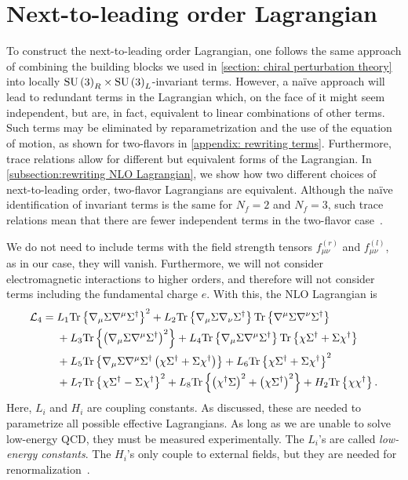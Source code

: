 \section{Next-to-leading order Lagrangian}
\label{section: nlo chpt}


To construct the next-to-leading order Lagrangian, one follows the same approach of combining the building blocks we used in \autoref{section: chiral perturbation theory} into locally $\text{SU}\left(3\right)_R\times\text{SU}\left(3\right)_L$-invariant terms.
However, a naïve approach will lead to redundant terms in the Lagrangian which, on the face of it might seem independent, but are, in fact, equivalent to linear combinations of other terms.
Such terms may be eliminated by reparametrization and the use of the equation of motion, as shown for two-flavors in \autoref{appendix: rewriting terms}.
Furthermore, trace relations allow for different but equivalent forms of the Lagrangian.
In \autoref{subsection:rewriting NLO Lagrangian}, we show how two different choices of next-to-leading order, two-flavor Lagrangians are equivalent.
Although the naïve identification of invariant terms is the same for $N_f = 2$ and $N_f=3$, such trace relations mean that there are fewer independent terms in the two-flavor case~\autocite{schererIntroductionChiralPerturbation2002}.

We do not need to include terms with the field strength tensors $f_{\mu\nu}^{(r)}$ and $f_{\mu\nu}^{(l)}$, as in our case, they will vanish.
Furthermore, we will not consider electromagnetic interactions to higher orders, and therefore will not consider terms including the fundamental charge $e$.
With this, the NLO Lagrangian is~\autocite{gasserChiralPerturbationTheory1985}
%
\begin{align}
    \label{NLO Lagrangian three flavor}
    \nonumber
    \mathcal{L}_4 
    ={} &
    L_1\text{Tr} \left\{ \nabla_\mu \Sigma \nabla^\mu \Sigma^\dagger \right\}^2
    + L_2 \text{Tr} \left\{ \nabla_\mu \Sigma \nabla_\nu \Sigma^\dagger \right\} 
    \text{Tr} \left\{ \nabla^\mu \Sigma \nabla^\nu \Sigma^\dagger \right\}\\ \nonumber
    & + L_3 \text{Tr} \left\{ \left(\nabla_\mu \Sigma \nabla^\mu \Sigma^\dagger\right)^2 \right\} 
    + L_4 \text{Tr} \left\{ \nabla_\mu \Sigma \nabla^\mu \Sigma^\dagger \right\} 
    \text{Tr} \left\{ \chi \Sigma^\dagger + \Sigma \chi^\dagger \right\}\\ \nonumber
    & + L_5 \text{Tr} \left\{ 
        \nabla_\mu \Sigma \nabla^\mu \Sigma^\dagger 
        \left(\chi \Sigma^\dagger + \Sigma \chi^\dagger\right)
     \right\}
    + L_6 \text{Tr} \left\{ \chi \Sigma^\dagger + \Sigma \chi^\dagger \right\}^2
    \\ & 
    + L_7 \text{Tr} \left\{ \chi \Sigma^\dagger - \Sigma \chi^\dagger \right\}^2 
    + L_8 \text{Tr} \left\{  \left(\chi^\dagger \Sigma \right)^2 + \left(\chi \Sigma^\dagger \right)^2 \right\}
    + H_2 \text{Tr} \left\{ \chi \chi^\dagger \right\}.
\end{align}
%
Here, $L_i$ and $H_i$ are coupling constants.
As discussed, these are needed to parametrize all possible effective Lagrangians.
As long as we are unable to solve low-energy QCD, they must be measured experimentally.
The $L_i$'s are called \emph{low-energy constants}.
The $H_i$'s only couple to external fields, but they are needed for renormalization~\autocite{gasserChiralPerturbationTheory1985}.

